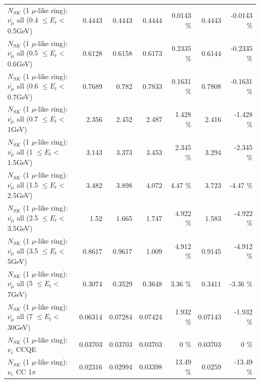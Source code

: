 \begin{table}
\begin{tabular}{| l | r | r | r  r | r  r |}
 $N_{SK}$ (1 $\mu$-like ring): $\bar{\nu_{\mu}}$ all (0.4 $\leq E_{t} <$ 0.5GeV) &          0.4443 &          0.4443 &          0.4444 &   0.0143 \%  &          0.4443 &  -0.0143 \%  \\ 
 $N_{SK}$ (1 $\mu$-like ring): $\bar{\nu_{\mu}}$ all (0.5 $\leq E_{t} <$ 0.6GeV) &          0.6128 &          0.6158 &          0.6173 &   0.2335 \%  &          0.6144 &  -0.2335 \%  \\ 
 $N_{SK}$ (1 $\mu$-like ring): $\bar{\nu_{\mu}}$ all (0.6 $\leq E_{t} <$ 0.7GeV) &          0.7689 &           0.782 &          0.7833 &   0.1631 \%  &          0.7808 &  -0.1631 \%  \\ 
   $N_{SK}$ (1 $\mu$-like ring): $\bar{\nu_{\mu}}$ all (0.7 $\leq E_{t} <$ 1GeV) &           2.356 &           2.452 &           2.487 &    1.428 \%  &           2.416 &   -1.428 \%  \\ 
   $N_{SK}$ (1 $\mu$-like ring): $\bar{\nu_{\mu}}$ all (1 $\leq E_{t} <$ 1.5GeV) &           3.143 &           3.373 &           3.453 &    2.345 \%  &           3.294 &   -2.345 \%  \\ 
 $N_{SK}$ (1 $\mu$-like ring): $\bar{\nu_{\mu}}$ all (1.5 $\leq E_{t} <$ 2.5GeV) &           3.482 &           3.898 &           4.072 &     4.47 \%  &           3.723 &    -4.47 \%  \\ 
 $N_{SK}$ (1 $\mu$-like ring): $\bar{\nu_{\mu}}$ all (2.5 $\leq E_{t} <$ 3.5GeV) &            1.52 &           1.665 &           1.747 &    4.922 \%  &           1.583 &   -4.922 \%  \\ 
   $N_{SK}$ (1 $\mu$-like ring): $\bar{\nu_{\mu}}$ all (3.5 $\leq E_{t} <$ 5GeV) &          0.8617 &          0.9617 &           1.009 &    4.912 \%  &          0.9145 &   -4.912 \%  \\ 
     $N_{SK}$ (1 $\mu$-like ring): $\bar{\nu_{\mu}}$ all (5 $\leq E_{t} <$ 7GeV) &          0.3074 &          0.3529 &          0.3648 &     3.36 \%  &          0.3411 &    -3.36 \%  \\ 
    $N_{SK}$ (1 $\mu$-like ring): $\bar{\nu_{\mu}}$ all (7 $\leq E_{t} <$ 30GeV) &         0.06314 &         0.07284 &         0.07424 &    1.932 \%  &         0.07143 &   -1.932 \%  \\ 
\hline
\hline
\hline
                                      $N_{SK}$ (1 $\mu$-like ring): $\nu_e$ CCQE &         0.03703 &         0.03703 &         0.03703 &        0 \%  &         0.03703 &        0 \%  \\ 
                                 $N_{SK}$ (1 $\mu$-like ring): $\nu_e$ CC 1$\pi$ &         0.02316 &         0.02994 &         0.03398 &    13.49 \%  &          0.0259 &   -13.49 \%  \\ 

\end{tabular}
\end{table}
